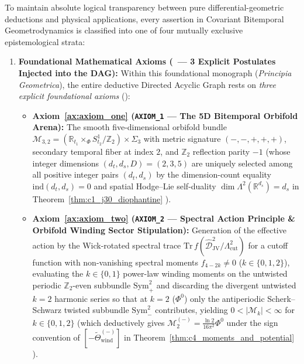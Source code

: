 \documentclass[11pt,a4paper]{article}
\newcommand{\catA}{\text{\textbf{\textcolor{purple!80!black}{[A]}}}}
\newcommand{\catD}{\text{\textbf{\textcolor{blue!75!black}{[D]}}}}
\theoremstyle{definition}
\theoremstyle{plain}
\theoremstyle{remark}
\begin{document}
To maintain absolute logical transparency between pure differential-geometric deductions and physical applications, every assertion in Covariant Bitemporal Geometrodynamics is classified into one of four mutually exclusive epistemological strata:
\begin{enumerate}[label=\arabic*.]
  \item \textbf{Foundational Mathematical Axioms (\catA\ --- 3 Explicit Postulates Injected into the DAG):}
  Within this foundational monograph (\textit{Principia Geometrica}), the entire deductive Directed Acyclic Graph rests on \emph{three explicit foundational axioms} (\catA):
  \begin{itemize}[leftmargin=1.1cm]
    \item \textbf{Axiom~\ref{ax:axiom_one} (\texttt{AXIOM\_1} --- The 5D Bitemporal Orbifold Arena):} The smooth five-dimensional orbifold bundle $\mathcal{M}_{3,2} = (\mathbb{R}_{t_1} \times_\Phi S^1_{t_2}/\mathbb{Z}_2) \times \Sigma_3$ with metric signature $(-,-,+,+,+)$, secondary temporal fiber at index $2$, and $\mathbb{Z}_2$ reflection parity $-1$ (whose integer dimensions $(d_t, d_s, D) = (2, 3, 5)$ are uniquely selected among all positive integer pairs $(d_t, d_s)$ by the dimension-count equality $\mathrm{ind}(d_t, d_s) = 0$ and spatial Hodge--Lie self-duality $\dim\Lambda^2(\mathbb{R}^{d_s}) = d_s$ in Theorem~\ref{thm:c1_j30_diophantine} \catD).
    \item \textbf{Axiom~\ref{ax:axiom_two} (\texttt{AXIOM\_2} --- Spectral Action Principle \& Orbifold Winding Sector Stipulation):} Generation of the effective action by the Wick-rotated spectral trace $\mathrm{Tr}\,f(\widehat{\mathcal{D}}_{\mathrm{JV}}^2/\Lambda_{\mathrm{cut}}^2)$ for a cutoff function with non-vanishing spectral moments $f_{4-2k} \neq 0$ ($k \in \{0, 1, 2\}$), evaluating the $k \in \{0, 1\}$ power-law winding moments on the untwisted periodic $\mathbb{Z}_2$-even subbundle $\mathrm{Sym}^2_+$ and discarding the divergent untwisted $k = 2$ harmonic series so that at $k = 2$ ($\Phi^0$) only the antiperiodic Scherk--Schwarz twisted subbundle $\mathrm{Sym}^2_-$ contributes, yielding $0 < |\mathcal{M}_k| < \infty$ for $k \in \{0, 1, 2\}$ (which deductively gives $\mathcal{M}_2^{(-)} = \frac{\ln 2}{16\pi^2}\Phi^0$ under the sign convention of $[-\widetilde{\Theta}_{\mathrm{wind}}^{(-)}]$ in Theorem~\ref{thm:c4_moments_and_potential} \catD).

\end{itemize}
\end{enumerate}
\end{document}

